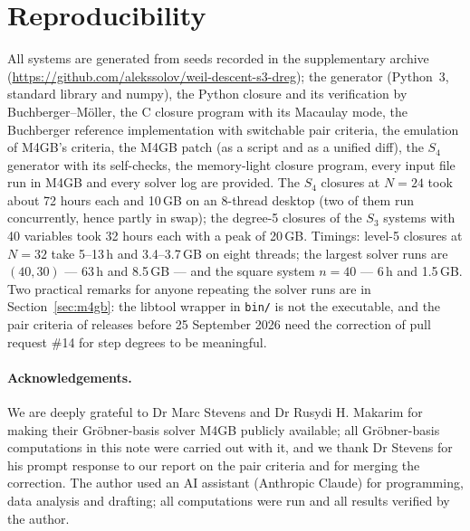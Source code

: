 \documentclass[11pt,a4paper]{article}
\theoremstyle{remark}\newtheorem{remark}{Remark}
\begin{document}
\section{Reproducibility}

All systems are generated from seeds recorded in the supplementary archive (\url{https://github.com/alekssolov/weil-descent-s3-dreg}); the generator (Python~3, standard library and numpy), the Python closure and its verification by Buchberger--Möller, the C closure program with its Macaulay mode, the Buchberger reference implementation with switchable pair criteria, the emulation of M4GB's criteria, the M4GB patch (as a script and as a unified diff), the $S_4$ generator with its self-checks, the memory-light closure program, every input file run in M4GB and every solver log are provided. The $S_4$ closures at $N=24$ took about 72 hours each and 10\,GB on an 8-thread desktop (two of them run concurrently, hence partly in swap); the degree-5 closures of the $S_3$ systems with 40 variables took 32 hours each with a peak of 20\,GB. Timings: level-5 closures at $N=32$ take 5--13\,h and 3.4--3.7\,GB on eight threads; the largest solver runs are $(40,30)$ --- 63\,h and 8.5\,GB --- and the square system $n=40$ --- 6\,h and 1.5\,GB. Two practical remarks for anyone repeating the solver runs are in Section~\ref{sec:m4gb}: the libtool wrapper in \texttt{bin/} is not the executable, and the pair criteria of releases before 25 September 2026 need the correction of pull request \#14 for step degrees to be meaningful.

\paragraph{Acknowledgements.} We are deeply grateful to Dr Marc Stevens and Dr Rusydi H. Makarim for making their Gröbner-basis solver M4GB publicly available; all Gröbner-basis computations in this note were carried out with it, and we thank Dr Stevens for his prompt response to our report on the pair criteria and for merging the correction. The author used an AI assistant (Anthropic Claude) for programming, data analysis and drafting; all computations were run and all results verified by the author.
\end{document}

